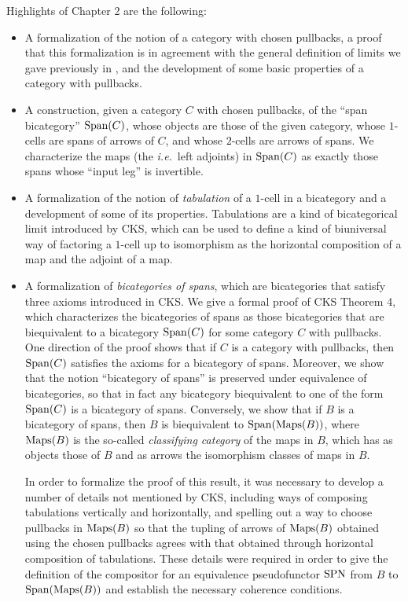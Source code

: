 \documentclass[11pt,notitlepage,a4paper]{report}
\begin{document}
Highlights of Chapter 2 are the following:
\begin{itemize}
\item  A formalization of the notion of a category with chosen pullbacks, a proof that
  this formalization is in agreement with the general definition of limits we gave
  previously in \cite{Category3-AFP}, and the development of some basic properties
  of a category with pullbacks.
%
\item  A construction, given a category $C$ with chosen pullbacks, of the ``span bicategory''
  ${\rm Span}(C)$, whose objects are those of the given category, whose $1$-cells are spans
  of arrows of $C$, and whose $2$-cells are arrows of spans.
  We characterize the maps (the \emph{i.e.}~left adjoints) in ${\rm Span}(C)$ as
  exactly those spans whose ``input leg'' is invertible.
%
\item  A formalization of the notion of \emph{tabulation} of a $1$-cell in a bicategory
  and a development of some of its properties.  Tabulations are a kind of bicategorical
  limit introduced by CKS, which can be used to define a kind of biuniversal way of factoring
  a $1$-cell up to isomorphism as the horizontal composition of a map and the adjoint of
  a map.
%
\item  A formalization of \emph{bicategories of spans}, which are bicategories that satisfy
  three axioms introduced in CKS.  We give a formal proof of CKS Theorem 4,
  which characterizes the bicategories of spans as those bicategories that are biequivalent
  to a bicategory ${\rm Span}(C)$ for some category $C$ with pullbacks.
  One direction of the proof shows that if $C$ is a category with pullbacks,
  then ${\rm Span}(C)$ satisfies the axioms for a bicategory of spans.
  Moreover, we show that the notion ``bicategory of spans'' is preserved under equivalence
  of bicategories, so that in fact any bicategory biequivalent to one of the form ${\rm Span}(C)$
  is a bicategory of spans.
  Conversely, we show that if $B$ is a bicategory of spans, then $B$ is biequivalent
  to ${\rm Span}({\rm Maps}(B))$, where ${\rm Maps}(B)$ is the so-called \emph{classifying category}
  of the maps in $B$, which has as objects those of $B$ and as arrows the isomorphism classes
  of maps in $B$.

  In order to formalize the proof of this result, it was necessary to develop a number of
  details not mentioned by CKS, including ways of composing tabulations vertically and
  horizontally, and spelling out a way to choose pullbacks in ${\rm Maps}(B)$ so that
  the tupling of arrows of ${\rm Maps}(B)$ obtained using the chosen pullbacks agrees
  with that obtained through horizontal composition of tabulations.
  These details were required in order to give the definition of the compositor for an equivalence
  pseudofunctor ${\rm SPN}$ from $B$ to ${\rm Span}({\rm Maps}(B))$ and establish the
  necessary coherence conditions.
\end{itemize}
\end{document}

